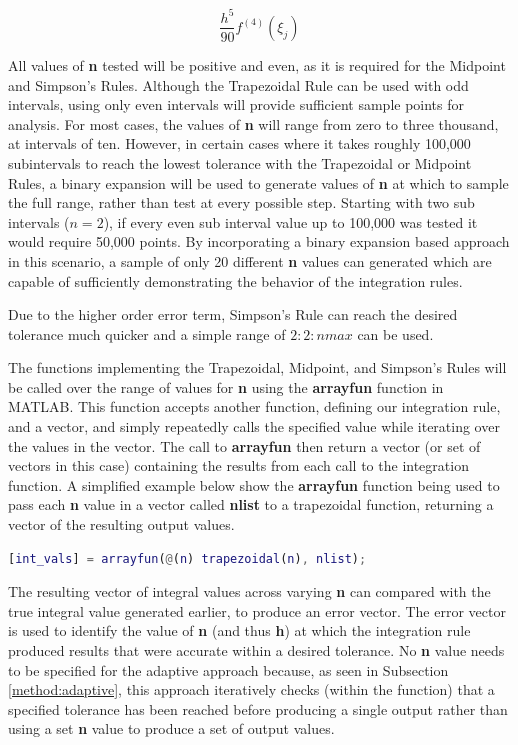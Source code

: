 \documentclass[a4paper]{article}
\begin{document}
\begin{equation}
\frac{h^5}{90}f^{(4)}(\xi_j)
\label{sim_err}
\end{equation}

All values of \textbf{n} tested will be positive and even, as it is required for the Midpoint and Simpson's Rules. Although the Trapezoidal Rule can be used with odd intervals, using only even intervals will provide sufficient sample points for analysis. For most cases, the values of \textbf{n} will range from zero to three thousand, at intervals of ten. However, in certain cases where it takes roughly 100,000 subintervals to reach the lowest tolerance with the Trapezoidal or Midpoint Rules, a binary expansion will be used to generate values of \textbf{n} at which to sample the full range, rather than test at every possible step. Starting with two sub intervals ($n=2$), if every even sub interval value up to 100,000 was tested it would require 50,000 points. By incorporating a binary expansion based approach in this scenario, a sample of only 20 different \textbf{n} values can generated which are capable of sufficiently demonstrating the behavior of the integration rules.

Due to the higher order error term, Simpson's Rule can reach the desired tolerance much quicker and a simple range of $2:2:nmax$ can be used. 

The functions implementing the Trapezoidal, Midpoint, and Simpson's Rules will be called over the range of values for \textbf{n} using the \textbf{arrayfun} function in MATLAB. This function accepts another function, defining our integration rule, and a vector, and simply repeatedly calls the specified value while iterating over the values in the vector. The call to \textbf{arrayfun} then return a vector (or set of vectors in this case) containing the results from each call to the integration function. A simplified example below show the \textbf{arrayfun} function being used to pass each \textbf{n} value in a vector called \textbf{nlist} to a trapezoidal function, returning a vector of the resulting output values.

\bigskip
\begin{lstlisting}[language=Matlab]
[int_vals] = arrayfun(@(n) trapezoidal(n), nlist);
\end{lstlisting}
\bigskip

The resulting vector of integral values across varying \textbf{n} can compared with the true integral value generated earlier, to produce an error vector. The error vector is used to identify the value of \textbf{n} (and thus \textbf{h}) at which the integration rule produced results that were accurate within a desired tolerance. No \textbf{n} value needs to be specified for the adaptive approach because, as seen in Subsection \ref{method:adaptive}, this approach iteratively checks (within the function) that a specified tolerance has been reached before producing a single output rather than using a set \textbf{n} value to produce a set of output values.
\end{document}
